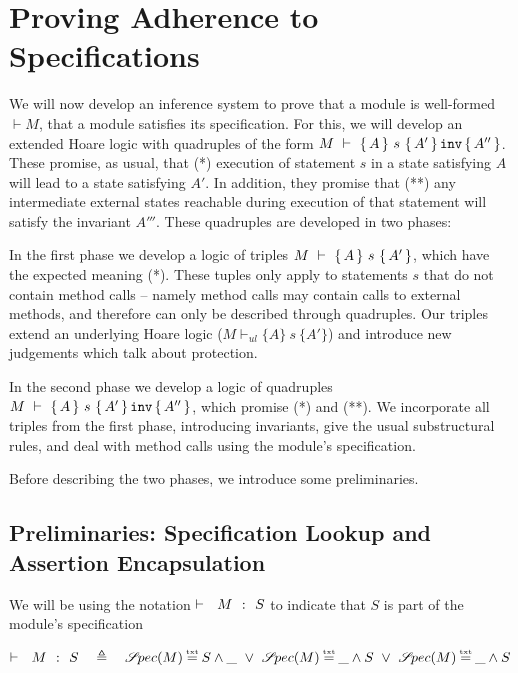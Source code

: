 \section{Proving Adherence to \SpecLang Specifications}
\label{sect:proofSystem}

We will now develop an inference system to prove that a module is well-formed $\vdash M$, \ie that a module satisfies its specification.
For this, we will   develop an extended  Hoare logic with quadruples of the  form  ${M\ \vdash\ \{\,A\, \} \ s\  \{\,A'\, \}\, {\texttt{inv}}\, \{\, A'' \, \} }$. 
These promise, as usual, that (*) execution of statement $s$ in a state satisfying $A$ will lead to a state satisfying $A'$.
In addition, they promise that (**) any intermediate external states reachable during execution of that statement will satisfy the invariant  $A'''$. 
These quadruples are developed in two phases:

In the first phase we develop a logic of triples ${M\ \vdash\ \{\,A\, \} \ s\  \{\,A'\, \} }$, which have the expected meaning (*).
These tuples only apply to statements $s$ that  do not contain method calls -- namely method calls may contain calls to external methods, and therefore can only be described through quadruples.
Our triples extend an underlying Hoare logic  (${M \vdash_{ul}  \{A\} {\ s\ } \{A'\} }$) and  introduce new judgements  which talk about protection.

In the second phase we develop a logic of quadruples ${M\ \vdash\ \{\,A\, \} \ s\  \{\,A'\, \}\, {\texttt{inv}}\, \{\, A'' \, \}}$, which promise (*) and (**).  We incorporate all triples from the first phase, %
introducing invariants, give the usual substructural rules, and deal with method calls using the module's specification.

\vspace{.1cm}
Before describing the two phases, we introduce some preliminaries. 
  

\subsection{Preliminaries: Specification Lookup and  Assertion Encapsulation}

We will be using the notation ${\vdash \ \ M\ \ \mathbf{:}\ \ S}$ to indicate that $S$ is part of the module's specification

\begin{definition}
 $\promises M S\ \ \ \triangleq\ \ \ \SpecOf M \txteq  S \wedge \_  \ \vee\  \SpecOf M \txteq \_ \wedge S   \ \vee\ \SpecOf M \txteq \_ \wedge S $
 \end{definition} 

